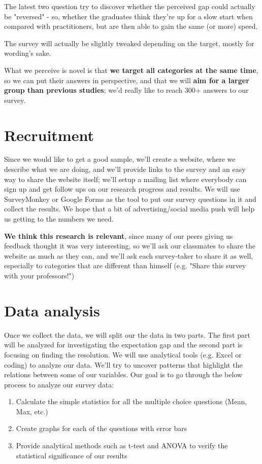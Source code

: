 \documentclass{sigchi}
\begin{document}
The latest two question try to discover whether the perceived gap could actually be "reversed" - so, whether the graduates think they're up for a slow start when compared with practitioners, but are then able to gain the same (or more) speed.
 
The survey will actually be slightly tweaked depending on the target, mostly for wording's sake.
 
 What we perceive is novel is that \textbf{we target all categories at the same time}, so we can put their answers in perspective, and that we will \textbf{aim for a larger group than previous studies}; we'd really like to reach 300+ answers to our survey.
 
\section{Recruitment}
Since we would like to get a good sample, we'll create a website, where we describe what we are doing, and we'll provide links to the survey and an easy way to share the website itself; we'll setup a mailing list where everybody can sign up and get follow ups on our research progress and results. We will use SurveyMonkey or Google Forms as the tool to put our survey questions in it and collect the results. We hope that a bit of advertising/social media push will help us getting to the numbers we need. 

 \textbf{We think this research is relevant}, since many of our peers giving us feedback thought it was very interesting, so we'll ask our classmates to share the website as much as they can, and we'll ask each survey-taker to share it as well, especially to categories that are different than himself (e.g. "Share this survey with your professors!")
 
 \section{Data analysis}
 Once we collect the data, we will split our the data in two parts. The first part will be analyzed for investigating the expectation gap and the second part is focusing on finding the resolution. We will use analytical tools (e.g. Excel or coding) to analyze our data. We'll try to uncover patterns that highlight the relations between some of our variables. Our goal is to go through the below process to analyze our survey data:\\
\begin{enumerate}
	\item Calculate the simple statistics for all the multiple choice questions (Mean, Max, etc.)
	\item Create graphs for each of the questions with error bars
	\item Provide analytical methods such as t-test and ANOVA to verify the statistical significance of our results
\end{enumerate}
\end{document}
